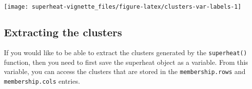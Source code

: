 \documentclass[]{book}
\newenvironment{Shaded}{\begin{snugshade}}{\end{snugshade}}
\newcommand{\KeywordTok}[1]{\textcolor[rgb]{0.13,0.29,0.53}{\textbf{{#1}}}}
\newcommand{\DataTypeTok}[1]{\textcolor[rgb]{0.13,0.29,0.53}{{#1}}}
\newcommand{\DecValTok}[1]{\textcolor[rgb]{0.00,0.00,0.81}{{#1}}}
\newcommand{\FloatTok}[1]{\textcolor[rgb]{0.00,0.00,0.81}{{#1}}}
\newcommand{\StringTok}[1]{\textcolor[rgb]{0.31,0.60,0.02}{{#1}}}
\newcommand{\CommentTok}[1]{\textcolor[rgb]{0.56,0.35,0.01}{\textit{{#1}}}}
\newcommand{\OtherTok}[1]{\textcolor[rgb]{0.56,0.35,0.01}{{#1}}}
\newcommand{\NormalTok}[1]{{#1}}
\theoremstyle{definition}
\theoremstyle{definition}
\theoremstyle{remark}
\begin{document}
\begin{center}\texttt{[image: superheat-vignette\_files/figure-latex/clusters-var-labels-1]} \end{center}

\subsection{Extracting the clusters}\label{extracting-the-clusters}

If you would like to be able to extract the clusters generated by the
\texttt{superheat()} function, then you need to first save the superheat
object as a variable. From this variable, you can access the clusters
that are stored in the \texttt{membership.rows} and
\texttt{membership.cols} entries.

\begin{Shaded}
\end{Shaded}
\end{document}
